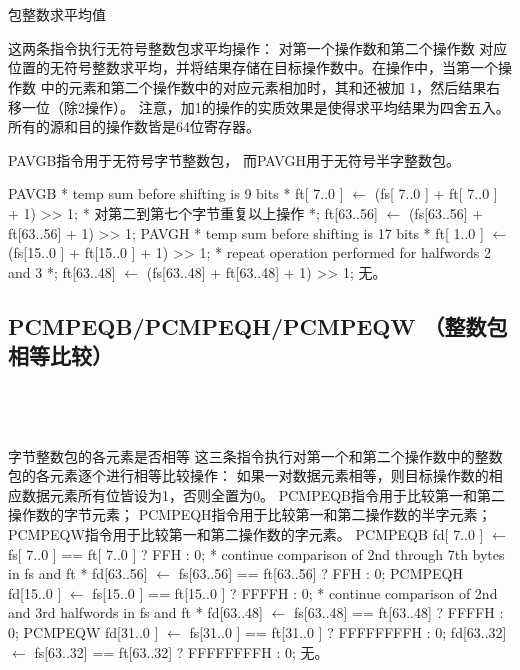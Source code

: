\begin{instructionblk}
   \\
   \\
  {包整数求平均值}
  {这两条指令执行无符号整数包求平均操作： 对第一个操作数和第二个操作数
  对应位置的无符号整数求平均，并将结果存储在目标操作数中。在操作中，当第一个操作数
  中的元素和第二个操作数中的对应元素相加时，其和还被加 1，然后结果右移一位（除2操作）。
  注意，加1的操作的实质效果是使得求平均结果为四舍五入。
  所有的源和目的操作数皆是64位寄存器。

  PAVGB指令用于无符号字节整数包， 而PAVGH用于无符号半字整数包。}
  {PAVGB \narrownewline
  * temp sum before shifting is 9 bits * \narrownewline
  ft[ 7..0 ] $\leftarrow$ (fs[ 7..0 ] + ft[ 7..0 ] + 1) >> 1; \narrownewline
  * 对第二到第七个字节重复以上操作 *; \narrownewline
  ft[63..56] $\leftarrow$ (fs[63..56] + ft[63..56] + 1) >> 1; \narrownewline \narrownewline
  PAVGH \narrownewline
  * temp sum before shifting is 17 bits * \narrownewline
  ft[ 1..0 ]  $\leftarrow$ (fs[15..0 ] + ft[15..0 ] + 1) >> 1; \narrownewline
  * repeat operation performed for halfwords 2 and 3 *; \narrownewline
  ft[63..48] $\leftarrow$ (fs[63..48] + ft[63..48] + 1) >> 1;}
  {无。}
\end{instructionblk}

\subsection{PCMPEQB/PCMPEQH/PCMPEQW （整数包相等比较）}

\begin{instructionblk}
   \\
   \\
   \\
  {字节整数包的各元素是否相等}
  {这三条指令执行对第一个和第二个操作数中的整数包的各元素逐个进行相等比较操作：
  如果一对数据元素相等，则目标操作数的相应数据元素所有位皆设为1，否则全置为0。
  PCMPEQB指令用于比较第一和第二操作数的字节元素；
  PCMPEQH指令用于比较第一和第二操作数的半字元素；
  PCMPEQW指令用于比较第一和第二操作数的字元素。}
  {PCMPEQB \narrownewline
  fd[ 7..0 ] $\leftarrow$ fs[ 7..0 ] == ft[ 7..0 ] ? FFH : 0; \narrownewline
  * continue comparison of 2nd through 7th bytes in fs and ft * \narrownewline
  fd[63..56] $\leftarrow$ fs[63..56] == ft[63..56] ? FFH : 0; \narrownewline \narrownewline
  PCMPEQH \narrownewline
  fd[15..0 ] $\leftarrow$ fs[15..0 ] == ft[15..0 ] ? FFFFH : 0; \narrownewline
  * continue comparison of 2nd and 3rd halfwords in fs and ft * \narrownewline
  fd[63..48] $\leftarrow$ fs[63..48] == ft[63..48] ? FFFFH : 0; \narrownewline \narrownewline
  PCMPEQW \narrownewline
  fd[31..0 ] $\leftarrow$ fs[31..0 ] == ft[31..0 ] ? FFFFFFFFH : 0; \narrownewline
  fd[63..32] $\leftarrow$ fs[63..32] == ft[63..32] ? FFFFFFFFH : 0;}
  {无。}
\end{instructionblk}

